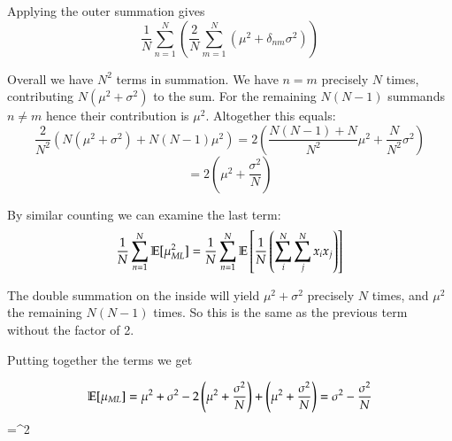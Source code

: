 \documentclass[../main.tex]{subfiles}
\begin{document}
\begin{enumerate}
Applying the outer summation gives
$$\frac{1}{N}\sum_{n=1}^N \left(\frac{2}{N}\sum_{m=1}^N(\mu^2 + \delta_{nm}\sigma^2)\right)$$

Overall we have $N^2$ terms in summation. We have $n=m$ precisely $N$ times, contributing $N(\mu^2 + \sigma^2)$ to the sum. For the remaining $N(N-1)$ summands $n \neq m$ hence their contribution is $\mu^2$. Altogether this equals:
$$\frac{2}{N^2}\left(N(\mu^2 + \sigma^2) + N(N-1)\mu^2\right) = 2\left(\frac{N(N-1) + N}{N^2}\mu^2 + \frac{N}{N^2}\sigma^2\right)$$
$$=2\left(\mu^2 +\frac{\sigma^2}{N}\right)$$

By similar counting we can examine the last term:
$$\frac{1}{N} \sum_{n=1}^N \mathbb{E}[\mu_{ML}^2] = \frac{1}{N}\sum_{n=1}^N \mathbb{E}\left[\frac{1}{N}\left(\sum_i^N\sum_j^Nx_i x_j\right)\right]$$

The double summation on the inside will yield $\mu^2 + \sigma^2$ precisely $N$ times, and $\mu^2$ the remaining $N(N-1)$ times. So this is the same as the previous term without the factor of 2. 

Putting together the terms we get

$$\E[\mu_{ML}] = \mu^2 + \sigma^2 - 2\left(\mu^2 + \frac{\sigma^2}{N}\right) +\left(\mu^2 + \frac{\sigma^2}{N}\right) = \sigma^2 - \frac{\sigma^2}{N}$$
$$=\sigma^2

\end{enumerate}
\end{document}
